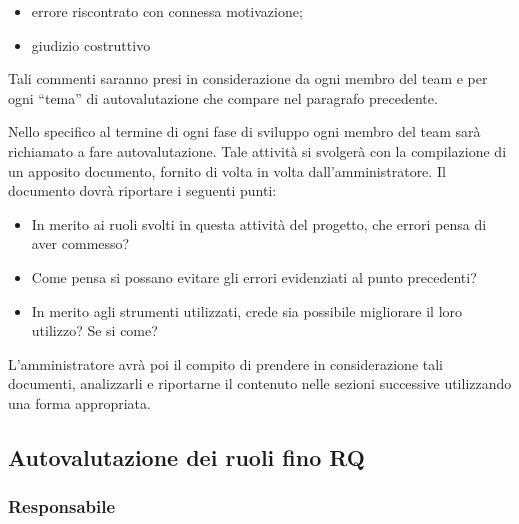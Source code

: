 \begin{itemize}
	\item errore riscontrato con connessa motivazione;
	\item giudizio costruttivo
\end{itemize}

Tali commenti saranno presi in considerazione da ogni membro del team e per ogni ``tema'' di autovalutazione che compare nel paragrafo precedente.

Nello specifico al termine di ogni fase di sviluppo ogni membro del team sarà richiamato a fare autovalutazione. Tale attività si svolgerà con la compilazione di un apposito documento, fornito di volta in volta dall'amministratore. Il documento dovrà riportare i seguenti punti:

\begin{itemize}
	\item In merito ai ruoli svolti in questa attività del progetto, che errori pensa di aver commesso?
	\item Come pensa si possano evitare gli errori evidenziati al punto precedenti?
	\item In merito agli strumenti utilizzati, crede sia possibile migliorare il loro utilizzo? Se si come?
\end{itemize}

L'amministratore avrà poi il compito di prendere in considerazione tali documenti, analizzarli e riportarne il contenuto nelle sezioni successive utilizzando una forma appropriata.

\subsection{Autovalutazione dei ruoli fino RQ}

\subsubsection{Responsabile}

